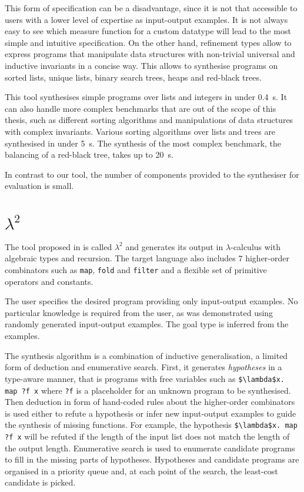 This form of specification can be a disadvantage, since it is not that accessible to users with a lower level of expertise as input-output examples. It is not always easy to see which measure function for a custom datatype will lead to the most simple and intuitive specification.
On the other hand, refinement types allow to express programs that manipulate data structures with non-trivial universal and inductive invariants in a concise way. This allows to synthesise programs on sorted lists, unique lists, binary search trees, heaps and red-black trees.

This tool synthesises simple programs over lists and integers in under \SI{0.4}{s}. It can also handle more complex benchmarks that are out of the scope of this thesis, such as different sorting algorithms and manipulations of data structures with complex invariants. Various sorting algorithms over lists and trees are synthesised in under \SI{5}{s}. The synthesis of the most complex benchmark, the balancing of a red-black tree, takes up to \SI{20}{s}.

In contrast to our tool, the number of components provided to the synthesiser for evaluation is small.

\section{$\lambda^2$}
The tool proposed in \cite{LambdaSquarePaper} is called $\lambda^2$ and generates its output in $\lambda$-calculus with algebraic types and recursion. The target language also includes $7$ higher-order combinators such as \lstinline!map!, \lstinline!fold! and \lstinline!filter! and a flexible set of primitive operators and constants.

The user specifies the desired program providing only input-output examples. No particular knowledge is required from the user, as was demonstrated using randomly generated input-output examples. The goal type is inferred from the examples.

The synthesis algorithm is a combination of inductive generalisation, a limited form of deduction and enumerative search.
First, it generates \emph{hypotheses} in a type-aware manner, that is programs with free variables such as \lstinline!$\lambda$x. map ?f x! where \lstinline!?f! is a placeholder for an unknown program to be synthesised.
Then deduction in form of hand-coded rules about the higher-order combinators is used either to refute a hypothesis or infer new input-output examples to guide the synthesis of missing functions. For example, the hypothesis \lstinline!$\lambda$x. map ?f x! will be refuted if the length of the input list does not match the length of the output length.
Enumerative search is used to enumerate candidate programs to fill in the missing parts of hypotheses. Hypotheses and candidate programs are organised in a priority queue and, at each point of the search, the least-cost candidate is picked.

